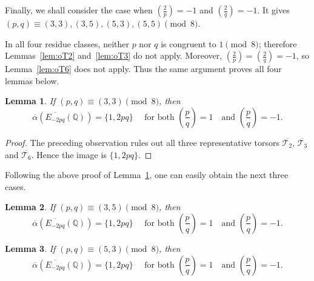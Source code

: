 \documentclass[12pt]{amsart}
\newcommand{\bbQ}{\mathbb{Q}}
\newcommand{\cT}{\mathcal{T}}
\newcommand{\legendre}[2]{\genfrac{(}{)}{}{}{#1}{#2}}
\numberwithin{equation}{section}
\newtheorem{lem}{Lemma}[section]
\theoremstyle{definition}
\begin{document}
Finally, we shall consider the case when $\legendre{2}{p}=-1$ and $\legendre{2}{q}=-1$. It gives $(p,q)\equiv (3,3),(3,5),(5,3),(5,5)\pmod 8$.

In all four residue classes, neither $p$ nor $q$ is congruent to $1\pmod8$;
therefore Lemmas~\ref{lem:oT2} and~\ref{lem:oT3} do not apply. Moreover,
$\legendre{2}{p}=\legendre{2}{q}=-1$, so Lemma~\ref{lem:oT6} does not apply.
Thus the same argument proves all four lemmas below.

\begin{lem}
\label{lem:oalpha_4.1} 
If $(p,q)\equiv (3,3)\pmod 8$, then
\[
\overline{\alpha}\left(\overline{E_{-2pq}}(\bbQ)\right)
= \{1,2pq\} \quad \text{ for both } \legendre{p}{q}=1 \quad \text{and } \legendre{p}{q}=-1.
\]
\end{lem}

\begin{proof}
The preceding observation rules out all three representative torsors
$\overline{\cT_2}$, $\overline{\cT_3}$ and $\overline{\cT_6}$.
Hence the image is $\{1,2pq\}$.
\end{proof}


Following the above proof of Lemma~\ref{lem:oalpha_4.1}, one can easily obtain the next three cases.
\begin{lem}
\label{lem:oalpha_4.2} 
If $(p,q)\equiv (3,5)\pmod 8$, then
\[
\overline{\alpha}\left(\overline{E_{-2pq}}(\bbQ)\right)
= \{1,2pq\} \quad \text{ for both } \legendre{p}{q}=1 \quad \text{and } \legendre{p}{q}=-1.
\]
\end{lem}





\begin{lem}
\label{lem:oalpha_4.3} 
If $(p,q)\equiv (5,3)\pmod 8$, then
\[
\overline{\alpha}\left(\overline{E_{-2pq}}(\bbQ)\right)
= \{1,2pq\} \quad \text{ for both } \legendre{p}{q}=1 \quad \text{and } \legendre{p}{q}=-1.
\]
\end{lem}


\end{document}
